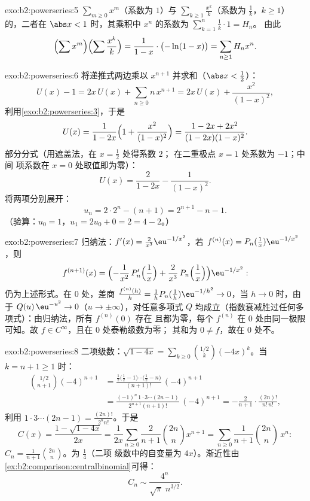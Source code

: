 \begin{solution}{exo:b2:powerseries:5}
$\sum_{m \geq 0} x^m$（系数为 $1$）与
$\sum_{k\geq1} \frac{x^k}{k}$（系数为 $\frac1k$，$k \geq
1$）的，二者在 $\abs x < 1$ 时，其乘积中
$x^n$ 的系数为 $\sum_{k=1}^{n} \frac1k \cdot 1 = H_n$。
由此
\[
\Bigl(\sum x^m\Bigr)\Bigl(\sum \frac{x^k}{k}\Bigr)
= \frac{1}{1-x}\cdot\bigl(-\ln(1-x)\bigr)
= \sum_{n\geq1} H_n x^n .
\]
\end{solution}

\begin{solution}{exo:b2:powerseries:6}
将递推式两边乘以 $x^{n+1}$ 并求和（$\abs x <
\frac12$）：
\[
U(x) - 1 = 2x\,U(x) + \sum_{n\geq0} n\,x^{n+1}
= 2x\,U(x) + \frac{x^2}{(1-x)^2} ,
\]
利用\cref{exo:b2:powerseries:3}，于是
\[
U(x) = \frac{1}{1 - 2x}\Bigl(1 + \frac{x^2}{(1-x)^2}\Bigr)
= \frac{1 - 2x + 2x^2}{(1-2x)(1-x)^2} .
\]
部分分式（用遮盖法，在 $x = \frac12$ 处得系数 $2$；
在二重极点 $x = 1$ 处系数为 $-1$；中间
项系数在 $x = 0$ 处取值即为零）：
\[
U(x) = \frac{2}{1-2x} - \frac{1}{(1 - x)^2} .
\]
将两项分别展开：
\[
u_n = 2\cdot 2^n - (n + 1) = 2^{n+1} - n - 1 .
\]
（验算：$u_0 = 1$，$u_1 = 2u_0 + 0 = 2 = 4 - 2$。）
\end{solution}

\begin{solution}{exo:b2:powerseries:7}
归纳法：$f'(x) = \frac{2}{x^3}\eu^{-1/x^2}$，若 $f^{(n)}(x)
= P_n(\tfrac1x)\eu^{-1/x^2}$，则
\[
f^{(n+1)}(x) =
\Bigl(-\frac{1}{x^2}\,P_n'\Bigl(\frac1x\Bigr) +
\frac{2}{x^3}\,P_n\Bigl(\frac1x\Bigr)\Bigr)\eu^{-1/x^2} :
\]
仍为上述形式。在 $0$ 处，差商 $\frac{f^{(n)}(h)}{h} =
\frac1h P_n(\frac1h)\eu^{-1/h^2} \to 0$，当 $h \to 0$ 时，由于
$Q(u)\,\eu^{-u^2} \to 0$（$u \to \pm\infty$），对任意多项式
$Q$ 均成立（指数衰减胜过任何多项式）：由归纳法，所有 $f^{(n)}(0)$ 存在
且都为零，每个 $f^{(n)}$ 在 $0$ 处由同一极限
可知。故 $f \in C^\infty$，且在 $0$ 处泰勒级数为零；
其和为 $0 \neq f$，故在 $0$ 处不。
\end{solution}

\begin{solution}{exo:b2:powerseries:8}
二项级数：$\sqrt{1-4x} = \sum_{k\geq0}
\binom{1/2}{k}(-4x)^k$。当 $k = n + 1 \geq 1$ 时：
\begin{align*}
\binom{1/2}{n+1}(-4)^{n+1}
&= \frac{\frac12\bigl(\frac12 - 1\bigr)\cdots\bigl(\frac12 -
n\bigr)}{(n+1)!}\,(-4)^{n+1}\\
&= \frac{(-1)^n\,1\cdot3\cdots(2n-1)}{2^{n+1}(n+1)!}\,(-4)^{n+1}
= -\frac{2}{n+1}\cdot\frac{(2n)!}{n!\,n!} ,
\end{align*}
利用 $1\cdot3\cdots(2n-1) = \frac{(2n)!}{2^n n!}$。于是
\[
C(x) = \frac{1 - \sqrt{1-4x}}{2x}
= \frac{1}{2x}\sum_{n\geq0}\frac{2}{n+1}\binom{2n}{n}x^{n+1}
= \sum_{n\geq0} \frac{1}{n+1}\binom{2n}{n}\,x^n :
\]
$C_n = \frac{1}{n+1}\binom{2n}{n}$。为 $\frac14$（二项
级数中的自变量为 $4x$）。渐近性由
\cref{ex:b2:comparison:centralbinomial}可得：
\[
C_n \sim \frac{4^n}{\sqrt{\pi}\; n^{3/2}} .
\]
\end{solution}


